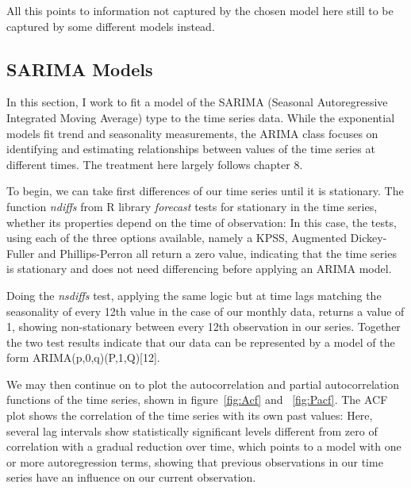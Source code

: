 \documentclass[9pt,technote]{IEEEtran}
\begin{document}
All this points to information not captured by the chosen model here still to be captured by some different models instead. 

\subsection{SARIMA Models}
\label{sec:arima}

In this section, I work to fit a model of the SARIMA (Seasonal Autoregressive Integrated Moving Average) type to the time series data.  While the exponential models fit trend and seasonality measurements, the ARIMA class focuses on identifying and estimating relationships between values of the time series at different times.  The treatment here largely follows \cite{fpp2} chapter 8.  

To begin, we can take first differences of our time series until it is stationary.  The function \textit{ndiffs} from R library \textit{forecast} tests for stationary in the time series, whether its properties depend on the time of observation:  In this case, the tests, using each of the three options available, namely a KPSS, Augmented Dickey-Fuller and  Phillips-Perron all return a zero value, indicating that the time series is stationary and does not need differencing before applying an ARIMA model.  

Doing the \textit{nsdiffs} test, applying the same logic but at time lags matching the seasonality of every 12th value in the case of our monthly data, returns a value of 1, showing non-stationary between every 12th observation in our series.  Together the two test results indicate that our data can be represented by a model of the form ARIMA(p,0,q)(P,1,Q)[12]. 

We may then continue on to plot the autocorrelation and partial autocorrelation functions of the time series, shown in figure~\ref{fig:Acf} and ~\ref{fig:Pacf}.  The ACF plot shows the correlation of the time series with its own past values: Here, several lag intervals show statistically significant levels different from zero of correlation with a gradual reduction over time, which points to a model with one or more autoregression terms, showing that previous observations in our time series have an influence on our current observation.  
\end{document}
